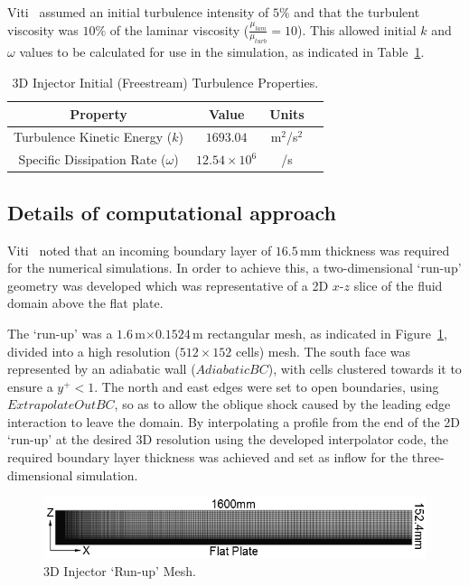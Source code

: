 Viti~\cite{schetz2009} assumed an initial turbulence intensity of $5\%$ and that the turbulent viscosity was $10\%$ of the laminar viscosity ($\frac{\mu_{lam}}{\mu_{turb}}=10$). This allowed initial $k$ and $\omega$ values to be calculated for use in the simulation, as indicated in Table~\ref{t:tc3:turb}.
%
\begin{table}[htbp]
  \caption{3D Injector Initial (Freestream) Turbulence Properties.}
  \label{t:tc3:turb}
  \begin{center}
  \begin{tabular}{cccl}
  \hline\hline
     Property  & Value & Units \\
  \hline
    Turbulence Kinetic Energy ($k$)  & $1693.04$ & m$^2$/s$^2$  \\
    Specific Dissipation Rate ($\omega$)  & $12.54\times10^6$ & /s  \\
  \hline\hline
  \end{tabular}
  \end{center}
\end{table}
%
\subsection{Details of computational approach}
Viti~\cite{schetz2009} noted that an incoming boundary layer of $16.5$\,mm thickness was required for the numerical simulations. In order to achieve this, a two-dimensional `run-up' geometry was developed which was representative of a 2D $x$-$z$ slice of the fluid domain above the flat plate. 

The `run-up' was a $1.6$\,m$\times0.1524$\,m rectangular mesh, as indicated in Figure~\ref{f:tc3:runupmesh}, divided into a high resolution ($512\times152$ cells) mesh. The south face was represented by an adiabatic wall ($AdiabaticBC$), with cells clustered towards it to ensure a $y^+<1$. The north and east edges were set to open boundaries, using  $ExtrapolateOutBC$, so as to allow the oblique shock caused by the leading edge interaction to leave the domain. By interpolating a profile from the end of the 2D `run-up' at the desired 3D resolution using the developed interpolator code, the required boundary layer thickness was achieved and set as inflow for the three-dimensional simulation.
%
\begin{figure}[htbp]
 \begin{center}
  \includegraphics[width=14cm]{./chap8-3Dinjector/figs/inject-runup-mesh.png}
  \caption{3D Injector `Run-up' Mesh.}
  \label{f:tc3:runupmesh}
 \end{center}
\end{figure}
%

